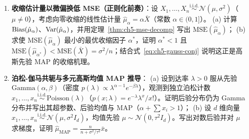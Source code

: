 \begin{enumerate}[label=\textbf{5.\arabic*}, resume]
  \item \textbf{收缩估计量以微偏换低 MSE（正则化前奏）}：设 $X_1, \dots, X_n \stackrel{\text{i.i.d.}}{\sim} \mathcal{N}(\mu, \sigma^2)$（$\mu \neq 0$），考虑向零收缩的线性估计量 $\hat{\mu}_\alpha = \alpha \bar{X}$（常数 $\alpha \in (0, 1]$）。
  (a) 计算 $\operatorname{Bias}(\hat{\mu}_\alpha)$、$\operatorname{Var}(\hat{\mu}_\alpha)$，并用定理~\ref{thm:ch5-mse-decomp} 写出 $\mathrm{MSE}(\hat{\mu}_\alpha)$；
  (b) 求使 $\mathrm{MSE}(\hat{\mu}_\alpha)$ 最小的最优收缩因子 $\alpha^*$，证明 $\alpha^* < 1$ 且 $\mathrm{MSE}(\hat{\mu}_{\alpha^*}) < \mathrm{MSE}(\bar{X}) = \sigma^2/n$；结合式~\eqref{eq:ch5-gauss-conj} 说明这正是高斯先验 MAP 的收缩机理。

  \item \textbf{泊松-伽马共轭与多元高斯均值 MAP 推导}：
  (a) 设到达率 $\lambda > 0$ 服从先验 $\mathrm{Gamma}(\alpha, \beta)$（密度 $p(\lambda) \propto \lambda^{\alpha - 1} e^{-\beta\lambda}$），观测到独立泊松计数 $x_1, \dots, x_n \stackrel{\text{i.i.d.}}{\sim} \mathrm{Poisson}(\lambda)$（$p(x;\lambda) = e^{-\lambda}\lambda^x / x!$）。证明后验分布仍为 Gamma 分布并写出其超参数、后验均值与 MAP（$\alpha + \sum x_i > 1$）；
  (b) 设 $d$ 维向量 $x_1, \dots, x_n \stackrel{\text{i.i.d.}}{\sim} \mathcal{N}(\mu, \sigma^2 I_d)$，均值先验 $\mu \sim \mathcal{N}(0, \tau^2 I_d)$。写出对数后验并对 $\mu$ 求梯度，证明 $\hat{\mu}_{\text{MAP}} = \frac{n}{n + \sigma^2/\tau^2}\bar{x}$。
\end{enumerate}

